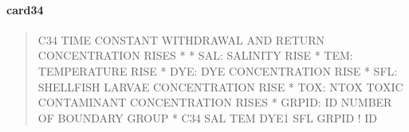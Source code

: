 \documentclass[letterpaper,10pt,english]{sphinxmanual}
\begin{document}
\paragraph{card34}
\label{\detokenize{inputfiles/runcontrol/card34:card34}}\label{\detokenize{inputfiles/runcontrol/card34::doc}}\begin{quote}

\begin{sphinxVerbatim}[commandchars=\\\{\}]
\PYGZhy{}\PYGZhy{}\PYGZhy{}\PYGZhy{}\PYGZhy{}\PYGZhy{}\PYGZhy{}\PYGZhy{}\PYGZhy{}\PYGZhy{}\PYGZhy{}\PYGZhy{}\PYGZhy{}\PYGZhy{}\PYGZhy{}\PYGZhy{}\PYGZhy{}\PYGZhy{}\PYGZhy{}\PYGZhy{}\PYGZhy{}\PYGZhy{}\PYGZhy{}\PYGZhy{}\PYGZhy{}\PYGZhy{}\PYGZhy{}\PYGZhy{}\PYGZhy{}\PYGZhy{}\PYGZhy{}\PYGZhy{}\PYGZhy{}\PYGZhy{}\PYGZhy{}\PYGZhy{}\PYGZhy{}\PYGZhy{}\PYGZhy{}\PYGZhy{}\PYGZhy{}\PYGZhy{}\PYGZhy{}\PYGZhy{}\PYGZhy{}\PYGZhy{}\PYGZhy{}\PYGZhy{}\PYGZhy{}\PYGZhy{}\PYGZhy{}\PYGZhy{}\PYGZhy{}\PYGZhy{}\PYGZhy{}\PYGZhy{}\PYGZhy{}\PYGZhy{}\PYGZhy{}\PYGZhy{}\PYGZhy{}\PYGZhy{}\PYGZhy{}\PYGZhy{}\PYGZhy{}\PYGZhy{}\PYGZhy{}\PYGZhy{}\PYGZhy{}\PYGZhy{}\PYGZhy{}\PYGZhy{}\PYGZhy{}\PYGZhy{}\PYGZhy{}\PYGZhy{}\PYGZhy{}\PYGZhy{}
C34 TIME CONSTANT WITHDRAWAL AND RETURN CONCENTRATION RISES
*
*  SAL:   SALINITY RISE
*  TEM:   TEMPERATURE RISE
*  DYE:   DYE CONCENTRATION RISE
*  SFL:   SHELLFISH LARVAE CONCENTRATION RISE
*  TOX\PYGZsh{}:  NTOX TOXIC CONTAMINANT CONCENTRATION RISES
*  GRPID: ID NUMBER OF BOUNDARY GROUP
*
C34       SAL       TEM      DYE1       SFL      GRPID ! ID
\end{sphinxVerbatim}
\end{quote}
\end{document}
